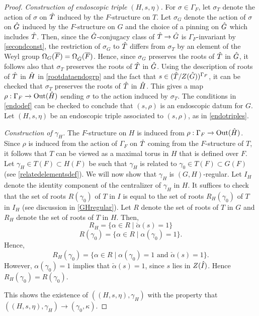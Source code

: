 \documentclass[11pt,a4paper]{article}
\theoremstyle{definition}
\theoremstyle{plain}
\theoremstyle{remark}
\theoremstyle{plain}
\DeclareMathOperator{\Out}{Out}
\begin{document}
\begin{proof}
    \textit{Construction of endoscopic triple $(H,s,\eta)$.} For $\sigma \in \Gamma_F$, let $\sigma_T$ denote the action of $\sigma$ on $\Hat{T}$ induced by the $F$-structure on $T$. Let $\sigma_G$ denote the action of $\sigma$ on $\Hat{G}$ induced by the $F$-structure on $G$ and the choice of a pinning on $\Hat{G}$ which includes $\Hat{T}$. Then, since the $\Hat{G}$-conjugacy class of $\Hat{T} \xrightarrow[]{} \Hat{G}$ is $\Gamma_F$-invariant by \ref{secondconst}, the restriction of $\sigma_G$ to $\Hat{T}$ differs from $\sigma_T$ by an element of the Weyl group $\Omega_G(\overline{F}) = \Omega_{\Hat{G}}(\overline{F})$. Hence, since $\sigma_G$ preserves the roots of $\Hat{T}$ in $\Hat{G}$, it follows also that $\sigma_T$ preserves the roots of $\Hat{T}$ in $\Hat{G}$. Using the description of roots of $\Hat{T}$ in $\Hat{H}$ in \ref{rootdataendogrp} and the fact that $s \in (\Hat{T}/Z(\Hat{G}))^{\Gamma_F}$, it can be checked that $\sigma_T$ preserves the roots of $\Hat{T}$ in $\Hat{H}$. This gives a map $\rho: \Gamma_F \xrightarrow[]{} \Out(\Hat{H})$ sending $\sigma$ to the action induced by $\sigma_T$. The conditions in \ref{endodef} can be checked to conclude that $(s,\rho)$ is an endoscopic datum for $G$. Let $(H,s,\eta)$ be an endoscopic triple associated to $(s,\rho)$, as in \ref{endotriples}.
    
    \textit{Construction of $\gamma_H$.} The $F$-structure on $H$ is induced from $\rho: \Gamma_F \xrightarrow[]{} \Out(\Hat{H})$. Since $\rho$ is induced from the action of $\Gamma_F$ on $\Hat{T}$ coming from the $F$-structure of $T$, it follows that $T$ can be viewed as a maximal torus in $H$ that is defined over $F$. Let $\gamma_H \in T(F) \subset H(F)$ be such that $\gamma_H$ is related to $\gamma_0 \in T(F) \subset G(F)$ (see \ref{relatedelementsdef}). We will now show that $\gamma_H$ is $(G,H)$-regular. Let $I_H$ denote the identity component of the centralizer of $\gamma_H$ in $H$. It suffices to check that the set of roots $R(\gamma_0)$ of $T$ in $I$ is equal to the set of roots $R_H(\gamma_0)$ of $T$ in $I_H$ (see discussion in \ref{GHregular}). Let $R$ denote the set of roots of $T$ in $G$ and $R_H$ denote the set of roots of $T$ in $H$. Then,
    $$ R_H = \{ \alpha \in R \mid \check{\alpha}(s) = 1 \} $$
    $$ R(\gamma_0) = \{ \alpha \in R \mid \alpha(\gamma_0) = 1 \}. $$
    Hence,
    $$ R_H(\gamma_0) = \{ \alpha \in R \mid \alpha(\gamma_0) = 1 \text{ and } \check{\alpha}(s) = 1\}.$$
    However, $\alpha(\gamma_0) = 1$ implies that $\check{\alpha} (s) = 1$, since $s$ lies in $Z(\Hat{I})$. Hence $R_H(\gamma_0) = R(\gamma_0)$.
    
    This shows the existence of $((H,s,\eta), \gamma_H)$ with the property that $((H,s,\eta),\gamma_H) \rightarrow (\gamma_0, \kappa)$.
\end{proof}
\end{document}
